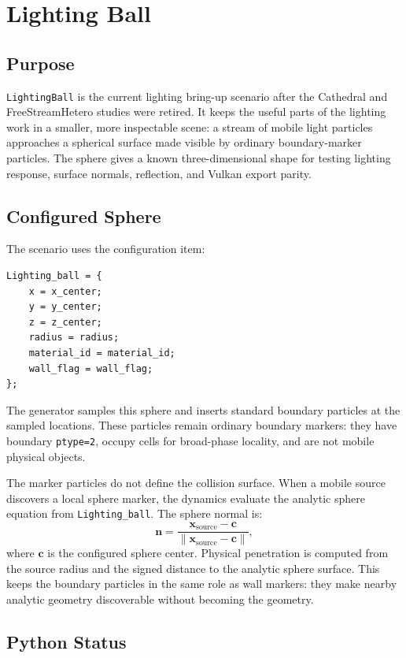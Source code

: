 \newpage
\section{Lighting Ball}

\subsection{Purpose}

\texttt{LightingBall} is the current lighting bring-up scenario after the
Cathedral and FreeStreamHetero studies were retired.  It keeps the useful
parts of the lighting work in a smaller, more inspectable scene: a stream of
mobile light particles approaches a spherical surface made visible by ordinary
boundary-marker particles.  The sphere gives a known three-dimensional shape
for testing lighting response, surface normals, reflection, and Vulkan export
parity.

\subsection{Configured Sphere}

The scenario uses the configuration item:
\begin{verbatim}
Lighting_ball = {
    x = x_center;
    y = y_center;
    z = z_center;
    radius = radius;
    material_id = material_id;
    wall_flag = wall_flag;
};
\end{verbatim}

The generator samples this sphere and inserts standard boundary particles at
the sampled locations.  These particles remain ordinary boundary markers:
they have boundary \texttt{ptype=2}, occupy cells for broad-phase
locality, and are not mobile physical objects.

The marker particles do not define the collision surface.  When a mobile
source discovers a local sphere marker, the dynamics evaluate the analytic
sphere equation from \texttt{Lighting\_ball}.  The sphere normal is:
\[
    \mathbf n =
    \frac{\mathbf x_{\mathrm{source}}-\mathbf c}
         {\lVert\mathbf x_{\mathrm{source}}-\mathbf c\rVert},
\]
where \(\mathbf c\) is the configured sphere center.  Physical penetration is
computed from the source radius and the signed distance to the analytic sphere
surface.  This keeps the boundary particles in the same role as wall markers:
they make nearby analytic geometry discoverable without becoming the geometry.

\subsection{Python Status}

